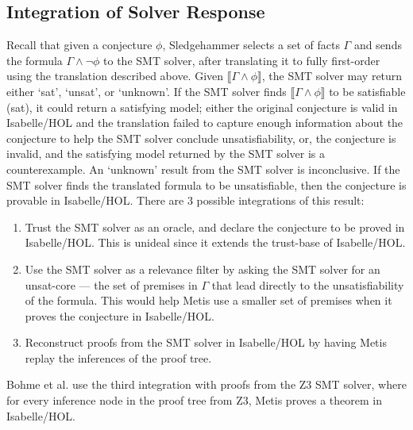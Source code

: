 \documentclass[11pt]{article}
\begin{document}
	\subsection{Integration of Solver Response}
	Recall that given a conjecture $\phi$, 
	Sledgehammer selects a set of facts 
	$\Gamma$ and sends the formula 
	$\Gamma \land \neg \phi$ to the SMT solver,
	after translating it to fully first-order
	using the translation described above.
	Given $\llbracket \Gamma \land 
	\phi \rrbracket$, the SMT solver may 
	return either `sat', `unsat',
	or `unknown'. If the SMT solver finds 
	$\llbracket \Gamma \land 
	\phi \rrbracket$ to be satisfiable
	(sat), it could return a satisfying model;
	either the original conjecture is valid
	in Isabelle/HOL and the translation 
	failed to capture enough information
	about the conjecture to help the 
	SMT solver conclude unsatisfiability, 
	or, the conjecture is invalid, and the 
	satisfying model returned by the SMT 
	solver is a counterexample. An 
	`unknown' result from the SMT 
	solver is inconclusive. If the
	SMT solver finds the translated
	formula to be unsatisfiable, then 
	the conjecture is provable in
	Isabelle/HOL. There are 3 possible 
	integrations of this result:
	\begin{enumerate}
		\item Trust the SMT solver as an oracle, 
		and declare the conjecture to be proved in 
		Isabelle/HOL. This is unideal since 
		it extends the trust-base of Isabelle/HOL.
		\item Use the SMT solver as a relevance 
		filter by asking the SMT solver for 
		an unsat-core --- the set of premises 
		in $\Gamma$ that lead directly to 
		the unsatisfiability of the formula. 
		This would help Metis use a smaller
		set of premises when it proves the 
		conjecture in Isabelle/HOL.
		\item Reconstruct proofs from the 
		SMT solver in Isabelle/HOL by having
		Metis replay the inferences of 
		the proof tree.
	\end{enumerate}
	Bohme et al. use the third integration 
	with proofs from the Z3 SMT solver, 
	where for every inference node in the 
	proof tree from Z3, Metis proves a 
	theorem in Isabelle/HOL.
	
	
	
	
\end{document}
